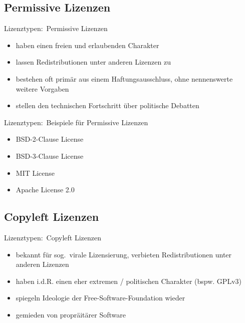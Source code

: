 \documentclass{beamer}
\begin{document}
\subsection{Permissive Lizenzen}
\begin{frame}{Lizenztypen:\ Permissive Lizenzen}
	\begin{itemize}
		\item haben einen freien und erlaubenden Charakter
		\item lassen Redistributionen unter anderen Lizenzen zu
		\item bestehen oft primär aus einem Haftungsausschluss, ohne
			nennenswerte weitere Vorgaben
		\item stellen den technischen Fortschritt über politische Debatten
	\end{itemize}
\end{frame}

\begin{frame}{Lizenztypen:\ Beispiele für Permissive Lizenzen}
	\begin{itemize}
		\item BSD-2-Clause License
		\item BSD-3-Clause License
		\item MIT License
		\item Apache License 2.0
	\end{itemize}
\end{frame}

\subsection{Copyleft Lizenzen}
\begin{frame}{Lizenztypen:\ Copyleft Lizenzen}
	\begin{itemize}
		\item bekannt für sog.\ virale Lizensierung,
			verbieten Redistributionen unter anderen Lizenzen
		\item haben i.d.R. einen eher extremen / politischen Charakter (bspw. GPLv3)
		\item spiegeln Ideologie der Free-Software-Foundation wieder
		\item gemieden von propräitärer Software
	\end{itemize}
\end{frame}
\end{document}
